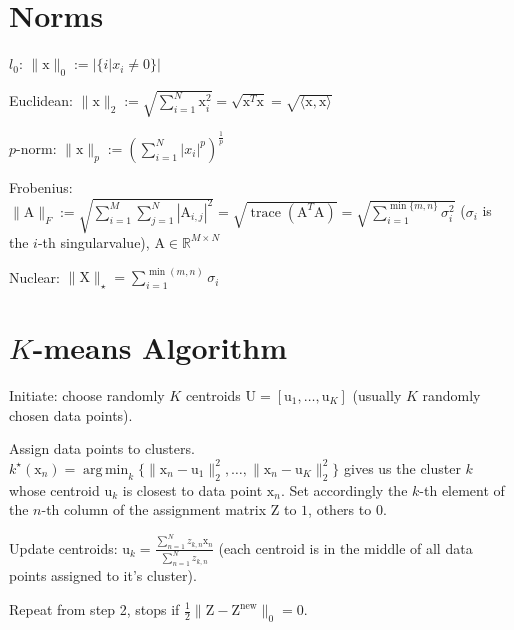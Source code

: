 \documentclass[a4paper, 11pt, landscape]{article}
\newcommand{\matr}[1]{\boldsymbol{\mathrm{#1}}}
\DeclareMathOperator*{\argmin}{arg\,min}
\begin{document}
\begin{multicols*}{3}
\section{Norms}
\begin{compactdesc}
	\item[$l_0$:] $\|\matr{x}\|_0 := |\{i | x_i \neq 0\}|$
	\item[Euclidean:] $\|\matr{x}\|_2 := \sqrt{\sum_{i=1}^{N} \matr{x}_i^2} = \sqrt{\matr{x}^T \matr{x}} = \sqrt{\langle \matr{x}, \matr{x} \rangle}$
	\item[$p$-norm:] $\|\matr{x}\|_p := \left( \sum_{i=1}^{N} |x_i|^p \right)^{\frac{1}{p}}$
	\item[Frobenius:] $\|\matr{A}\|_F :=\allowbreak \sqrt{\sum_{i=1}^{M} \sum_{j=1}^{N} |\matr{A}_{i, j}|^2} =\allowbreak \sqrt{\operatorname{trace}(\matr{A}^T \matr{A})} =\allowbreak \sqrt{\sum_{i=1}^{\min\{m, n\}} \sigma_i^2}$ ($\sigma_i$ is the $i$-th singularvalue), $\matr{A} \in \mathbb{R}^{M \times N}$
	\item[Nuclear:] $\|\matr{X}\|_\star = \sum_{i=1}^{\min(m, n)} \sigma_i$
\end{compactdesc}

\section{$K$-means Algorithm}
\begin{compactenum}
	\item Initiate: choose randomly $K$ centroids $\matr{U} = [\matr{u}_1, \ldots, \matr{u}_K]$ (usually $K$ randomly chosen data points).
	\item Assign data points to clusters. $k^\star(\matr{x}_n) = \argmin_k \{ \|\matr{x}_n - \matr{u}_1\|_2^2, \ldots, \|\matr{x}_n - \matr{u}_K\|_2^2 \}$ gives us the cluster $k$ whose centroid $\matr{u}_k$ is closest to data point $\matr{x}_n$. Set accordingly the $k$-th element of the $n$-th column of the assignment matrix $\matr{Z}$ to $1$, others to $0$.
	\item Update centroids: $\matr{u}_k = \frac{\sum_{n=1}^N z_{k,n} \matr{x}_n}{\sum_{n=1}^N z_{k,n}}$ (each centroid is in the middle of all data points assigned to it's cluster).
	\item Repeat from step 2, stops if $\frac{1}{2} \|\matr{Z} - \matr{Z}^\text{new}\|_0 = 0$.
\end{compactenum}


\end{multicols*}
\end{document}
